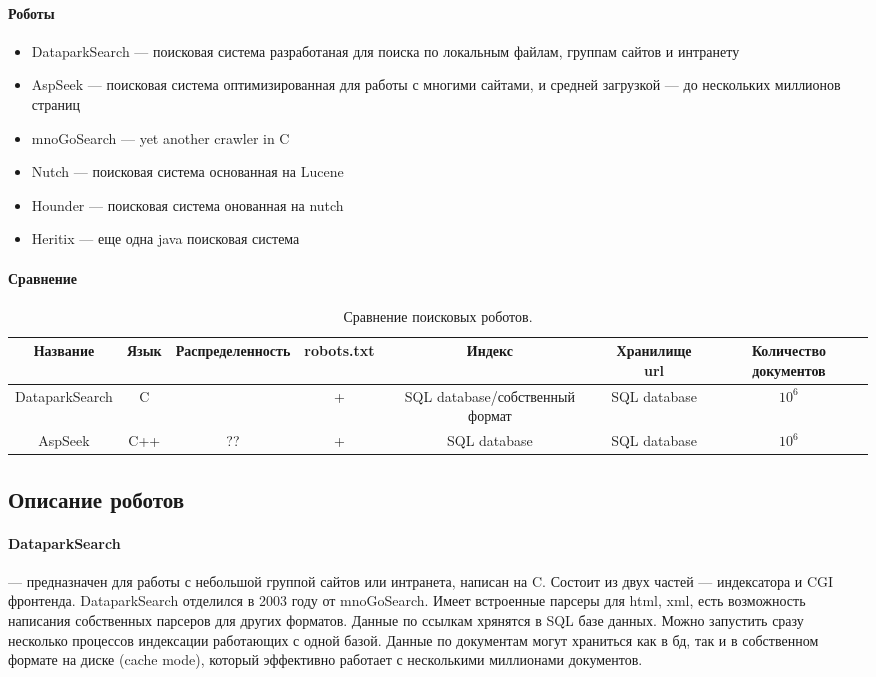 \paragraph{Роботы}
\begin{itemize}
 \item DataparkSearch --- поисковая система разработаная для поиска по локальным файлам, группам сайтов и интранету
 \item AspSeek --- поисковая система оптимизированная для работы с многими сайтами, и средней загрузкой --- до нескольких миллионов страниц
 \item mnoGoSearch --- yet another crawler in C
 \item Nutch --- поисковая система основанная на Lucene
 \item Hounder --- поисковая система онованная на nutch
 \item Heritix --- еще одна java поисковая система
\end{itemize}
\paragraph{Сравнение}
\begin{table}[h]
\caption{\label{tab:crawlers}Сравнение поисковых роботов.}
\begin{center}
\begin{tabular}{|c|c|c|c|c|c|c|}
\hline
Название & Язык & Распределенность & robots.txt & Индекс & Хранилище url & Количество документов\\
\hline
DataparkSearch & C & ~ & + & SQL database/собственный формат & SQL database & $10^{6}$\\
\hline
AspSeek & C++ & ?? & + & SQL database & SQL database & $10^{6}$\\
\hline
\end{tabular}
\end{center}
\end{table}
\subsection{Описание роботов}
\paragraph{DataparkSearch} --- предназначен для работы с небольшой группой сайтов или интранета, написан на
C. Состоит из двух частей --- индексатора и CGI фронтенда. DataparkSearch
отделился в 2003 году от mnoGoSearch. Имеет встроенные парсеры для html, xml,
есть возможность написания собственных парсеров для других форматов. Данные по
ссылкам хрянятся в SQL базе данных. Можно запустить сразу несколько процессов
индексации работающих с одной базой. Данные по документам могут храниться как в
бд, так и в собственном формате на диске (cache mode), который эффективно
работает с несколькими миллионами документов.
